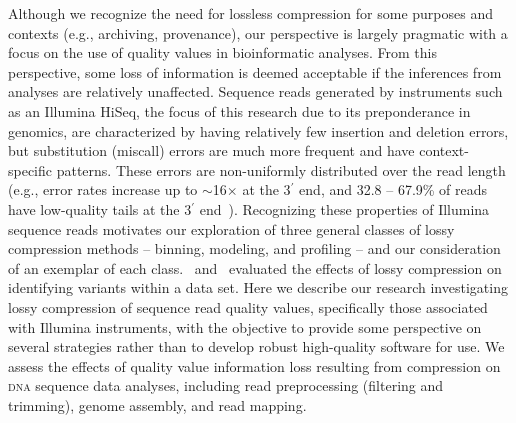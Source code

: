 \documentclass{bioinfo}
\begin{document}
Although we recognize the need for lossless compression for some
purposes and contexts (e.g., archiving, provenance), our perspective
is largely pragmatic with a focus on the use of quality values in
bioinformatic analyses. From this perspective, some loss of
information is deemed acceptable if the inferences from analyses are
relatively unaffected. Sequence reads generated by instruments such as
an Illumina HiSeq, the focus of this research due to its preponderance
in genomics, are characterized by having relatively few insertion and
deletion errors, but substitution (miscall) errors are much more
frequent and have context-specific patterns. These errors are
non-uniformly distributed over the read length (e.g., error rates
increase up to $\sim$16$\times$ at the 3$^{\prime}$ end, and 32.8 --
67.9\% of reads have low-quality tails at the 3$^{\prime}$
end~\citep{Minoche:2011km}). Recognizing these properties of Illumina
sequence reads motivates our exploration of three general classes of
lossy compression methods -- binning, modeling, and profiling -- and
our consideration of an exemplar of each class.~\cite{Canovas:2014fr}
and~\cite{janin2013adaptive} evaluated the effects of lossy
compression on identifying variants within a data set. Here we
describe our research investigating lossy compression of sequence read
quality values, specifically those associated with Illumina
instruments, with the objective to provide some perspective on several
strategies rather than to develop robust high-quality software for
use. We assess the effects of quality value information loss resulting
from compression on \textsc{dna} sequence data analyses, including
read preprocessing (filtering and trimming), genome assembly, and read
mapping.
\end{document}
